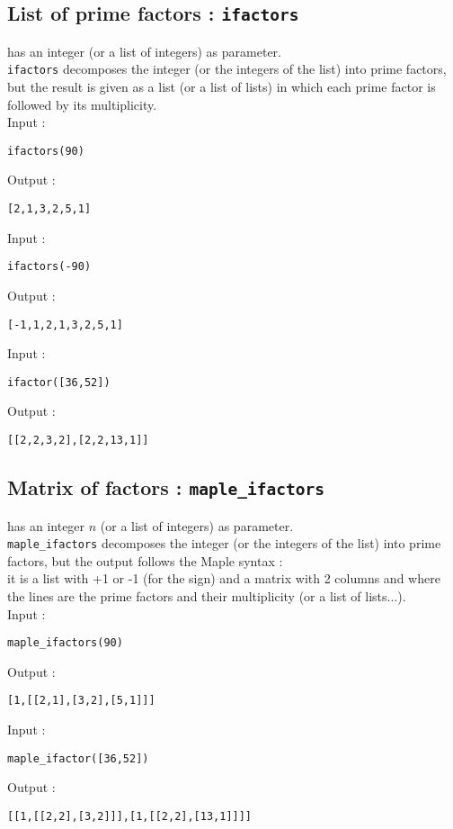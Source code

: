\documentclass[a4paper,11pt]{book}
\begin{document}
\subsection{List of prime factors : {\tt ifactors}}
 has an integer (or a list of integers) as  parameter.\\
{\tt ifactors} decomposes the integer (or the integers of the list) into prime 
factors, but the result
 is given as a list (or a list of lists) in which each prime factor is
followed by its multiplicity.\\
Input :
\begin{center}{\tt ifactors(90) }\end{center}
Output :
\begin{center}{\tt [2,1,3,2,5,1] }\end{center}
Input :
\begin{center}{\tt ifactors(-90) }\end{center}
Output :
\begin{center}{\tt [-1,1,2,1,3,2,5,1] }\end{center}
Input :
\begin{center}{\tt ifactor([36,52]) }\end{center}
Output :
\begin{center}{\tt [[2,2,3,2],[2,2,13,1]]}\end{center}
\subsection{Matrix of factors : {\tt maple\_ifactors}}
 has an integer $n$ (or a list of integers)
as parameter.\\
{\tt maple\_ifactors} decomposes the integer (or the integers of the list) into
prime factors, but the output follows the Maple syntax :\\
it is a list with +1 or -1 (for the sign) and a matrix with 2 columns and
 where the lines are the prime factors and their multiplicity (or a list of 
lists...).\\
Input :
\begin{center}{\tt maple\_ifactors(90) }\end{center}
Output :
\begin{center}{\tt [1,[[2,1],[3,2],[5,1]]]}\end{center}
Input :
\begin{center}{\tt maple\_ifactor([36,52]) }\end{center}
Output :
\begin{center}{\tt [[1,[[2,2],[3,2]]],[1,[[2,2],[13,1]]]]}\end{center}
\end{document}
